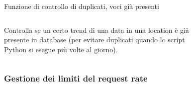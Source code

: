 \documentclass[xcolor=svgnames, aspectratio=169]{beamer}
\begin{document}
\begin{frame}{Funzione di controllo di duplicati, voci già presenti}
    \begin{columns}[t]
        Controlla se un certo trend di una data in una location è già presente in database (per evitare duplicati quando lo script Python si esegue più volte al giorno).
        
        \vspace*{-32pt}
        \begin{figure}[H]
            \centering
            \noindent{}
        \end{figure}
    \end{columns}
\end{frame}


\subsubsection{Gestione dei limiti del request rate}
\end{document}
